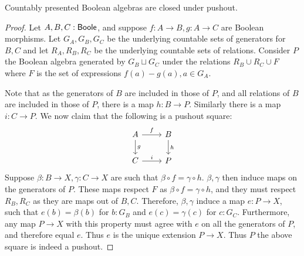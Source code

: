 \begin{lemma}\label{BoolePushouts}
  Countably presented Boolean algebras are closed under pushout. 
\end{lemma} 
\begin{proof}
  Let $A,B,C:\mathsf{Boole}$, and suppose $f:A\to B, g:A \to C$ are Boolean morphisms. 
  Let $G_A, G_B,G_C$ be the underlying countable sets of generators for $B,C$ and 
  let $R_A,R_B,R_C$ be the underlying countable sets of relations. 
  Consider $P$ the Boolean algebra generated by $G_B\sqcup G_C$ under the relations 
  $R_B\cup R_C \cup F$ where $F$ is the set of expressions $f(a)-g(a), a\in G_A$.
  
  Note that as the generators of $B$ are included in those of $P$, 
  and all relations of $B$ are included in those of $P$, there is a map $h:B\to P$. 
  Similarly there is a map $i:C\to P$. 
  We now claim that the following is a pushout square:
  \begin{equation}\begin{tikzcd}
    A \arrow[r,"f"] \arrow[d,"g"] & B \arrow[d,"h"]\\
    C \arrow[r,"i"] & P
  \end{tikzcd}\end{equation}  
  Suppose $\beta:B \to X, \gamma:C\to X$ are such that $\beta\circ f = \gamma \circ h$. 
  $\beta,\gamma$ then induce maps on the generators of $P$. 
  These maps respect $F$ as $\beta\circ f=\gamma\circ h$, and they must respect $R_B,R_C$ as they are maps out of $B,C$. 
  Therefore, $\beta,\gamma$ induce a map $e:P\to X$, such that 
  $e(b) = \beta(b)$ for $b:G_B$ and $e(c)=\gamma(c)$ for $c:G_C$. 
  Furthermore, any map $P\to X$ with this property must agree with $e$ on all the generators of $P$, 
  and therefore equal $e$. Thus $e$ is the unique extension $P\to X$. 
  Thus $P$ the above square is indeed a pushout. 
\end{proof}

